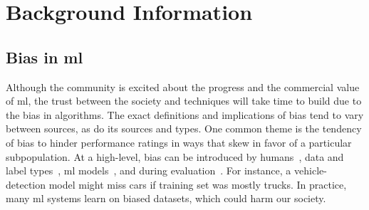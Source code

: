 
\section{Background Information}
\subsection{Bias in \gls{ml}}
Although the community is excited about the progress and the commercial value of \gls{ml}, the trust between the society and techniques will take time to build due to the bias in algorithms. The exact definitions and implications of bias tend to vary between sources, as do its sources and types. One common theme is the tendency of bias to hinder performance ratings in ways that skew in favor of a particular subpopulation. At a high-level, bias can be introduced by humans~\cite{windmann1998subconscious}, data and label types~\cite{tommasi2017deeper}, \gls{ml} models~\cite{amini2019uncovering, kim2019learning}, and during evaluation~\cite{stock2018convnets}. For instance, a vehicle-detection model might miss cars if training set was mostly trucks. In practice, many \gls{ml} systems learn on biased datasets, which could harm our society. 


